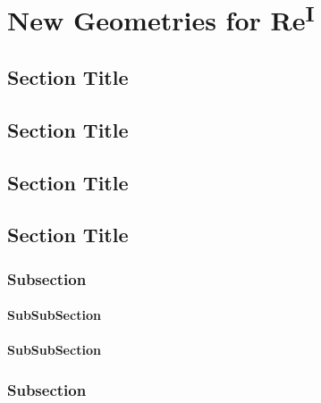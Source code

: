 \chapter{New Geometries for \texorpdfstring{Re\textsuperscript{I}}{Rhenium (I)}}
\section{Section Title}

\section{Section Title}

\section{Section Title}

\section{Section Title}
\subsection{Subsection}

\subsubsection{SubSubSection}

\subsubsection{SubSubSection}

\subsection{Subsection}


